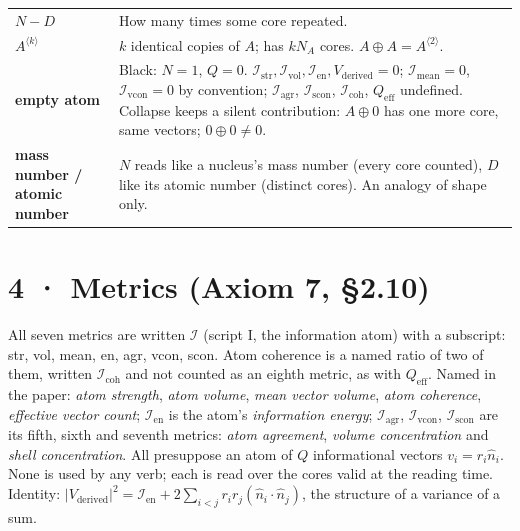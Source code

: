 \documentclass[10.5pt]{article}
\begin{document}
{\begin{longtable}{L{3.4cm}L{13.2cm}}
$N-D$ & How many times some core repeated. \\
$A^{\langle k\rangle}$ & $k$ identical copies of $A$; has $kN_A$ cores. $A\oplus A=A^{\langle2\rangle}$. \\
\textbf{empty atom} & Black: $N=1$, $Q=0$. $\mathcal{I}_{\mathrm{str}},\mathcal{I}_{\mathrm{vol}},\mathcal{I}_{\mathrm{en}},V_{\text{derived}}=0$; $\mathcal{I}_{\mathrm{mean}}=0$, $\mathcal{I}_{\mathrm{vcon}}=0$ by convention; $\mathcal{I}_{\mathrm{agr}}$, $\mathcal{I}_{\mathrm{scon}}$, $\mathcal{I}_{\mathrm{coh}}$, $Q_{\text{eff}}$ undefined. Collapse keeps a silent contribution: $A\oplus0$ has one more core, same vectors; $0\oplus0\neq0$. \\
\textbf{mass number / atomic number} & $N$ reads like a nucleus's mass number (every core counted), $D$ like its atomic number (distinct cores). An analogy of shape only. \\
\bottomrule
\end{longtable}}
\section*{4 · Metrics (Axiom 7, §2.10)}
All seven metrics are written $\mathcal{I}$ (script I, the information atom) with a subscript: str, vol, mean, en, agr, vcon, scon. Atom coherence is a named ratio of two of them, written $\mathcal{I}_{\mathrm{coh}}$ and not counted as an eighth metric, as with $Q_{\text{eff}}$. Named in the paper: \emph{atom strength}, \emph{atom volume}, \emph{mean vector volume}, \emph{atom coherence}, \emph{effective vector count}; $\mathcal{I}_{\mathrm{en}}$ is the atom's \emph{information energy}; $\mathcal{I}_{\mathrm{agr}}$, $\mathcal{I}_{\mathrm{vcon}}$, $\mathcal{I}_{\mathrm{scon}}$ are its fifth, sixth and seventh metrics: \emph{atom agreement}, \emph{volume concentration} and \emph{shell concentration}. All presuppose an atom of $Q$ informational vectors $v_i=r_i\hat n_i$. None is used by any verb; each is read over the cores valid at the reading time. Identity: $\lvert V_{\text{derived}}\rvert^2=\mathcal{I}_{\mathrm{en}}+2\sum_{i<j}r_ir_j(\hat n_i\!\cdot\!\hat n_j)$, the structure of a variance of a sum.
\end{document}
